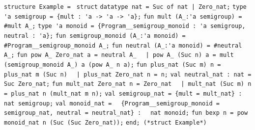 \begin{isabellebody}
\begin{isamarkuptext}
\verb|structure Example = |\newline%
\verb|struct|\newline%
\newline%
\verb|datatype nat = Suc of nat |\verb,|,\verb| Zero_nat;|\newline%
\newline%
\verb|type 'a semigroup = {mult : 'a -> 'a -> 'a};|\newline%
\verb|fun mult (A_:'a semigroup) = #mult A_;|\newline%
\newline%
\verb|type 'a monoid = {Program__semigroup_monoid : 'a semigroup, neutral : 'a};|\newline%
\verb|fun semigroup_monoid (A_:'a monoid) = #Program__semigroup_monoid A_;|\newline%
\verb|fun neutral (A_:'a monoid) = #neutral A_;|\newline%
\newline%
\verb|fun pow A_ Zero_nat a = neutral A_|\newline%
\verb|  |\verb,|,\verb| pow A_ (Suc n) a = mult (semigroup_monoid A_) a (pow A_ n a);|\newline%
\newline%
\verb|fun plus_nat (Suc m) n = plus_nat m (Suc n)|\newline%
\verb|  |\verb,|,\verb| plus_nat Zero_nat n = n;|\newline%
\newline%
\verb|val neutral_nat : nat = Suc Zero_nat;|\newline%
\newline%
\verb|fun mult_nat Zero_nat n = Zero_nat|\newline%
\verb|  |\verb,|,\verb| mult_nat (Suc m) n = plus_nat n (mult_nat m n);|\newline%
\newline%
\verb|val semigroup_nat = {mult = mult_nat} : nat semigroup;|\newline%
\newline%
\verb|val monoid_nat =|\newline%
\verb|  {Program__semigroup_monoid = semigroup_nat, neutral = neutral_nat} :|\newline%
\verb|  nat monoid;|\newline%
\newline%
\verb|fun bexp n = pow monoid_nat n (Suc (Suc Zero_nat));|\newline%
\newline%
\verb|end; (*struct Example*)|%

\end{isamarkuptext}
\end{isabellebody}
